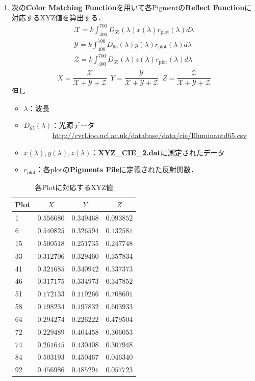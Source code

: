 \documentclass[a4paper,11pt]{jsarticle}
\numberwithin{theorem}{section}  %
\numberwithin{equation}{section} %
\begin{document}
\begin{enumerate}
\item

次の\textbf{Color Matching Function}を用いて各Pigmentの\textbf{Reflect Function}に対応するXYZ値を算出する．
\begin{eqnarray*}
\mathcal{X} = k\int_{400}^{700} D_{65}(\lambda)x(\lambda)r_{\text{plot}}(\lambda) d \lambda \\
\mathcal{Y} = k\int_{400}^{700} D_{65}(\lambda)y(\lambda)r_{\text{plot}}(\lambda) d \lambda \\
\mathcal{Z} = k\int_{400}^{700} D_{65}(\lambda)z(\lambda)r_{\text{plot}}(\lambda) d \lambda \\
\end{eqnarray*}
\begin{equation*}
X = \frac{\mathcal{X}}{\mathcal{X} + \mathcal{Y} + \mathcal{Z}}\,\,\,
Y = \frac{\mathcal{Y}}{\mathcal{X} + \mathcal{Y} + \mathcal{Z}}\,\,\,
Z = \frac{\mathcal{Z}}{\mathcal{X} + \mathcal{Y} + \mathcal{Z}}
\end{equation*}
但し
\begin{itemize}
\item $\lambda$：波長
\item $D_{65}(\lambda)$：光源データ\\
\,\,\,\,\,\,\,\,\,\,\,\,\,\,\,\,\,\,\,\,\,\,\,\,\url{http://cvrl.ioo.ucl.ac.uk/database/data/cie/Illuminantd65.csv}
\item $x(\lambda),y(\lambda),z(\lambda)$：\textbf{XYZ\_CIE\_2.dat}に測定されたデータ
\item $r_{\text{plot}}$：各plotの\textbf{Pigments File}に定義された反射関数．
\end{itemize}
\begin{table}[H]
\caption{各Plotに対応するXYZ値}
\begin{center}
\begin{tabular}{lccc}
\toprule
Plot & $X$ & $Y$ & $Z$  \\
\midrule
1 & $0.556680$ & $0.349468$ & $0.093852$\\
6 & $0.540825$ & $0.326594$ & $0.132581$\\
15 & $0.500518$ & $0.251735$ & $0.247748$\\
33 & $0.312706$ & $0.329460$ & $0.357834$\\
41 & $0.321685$ & $0.340942$ & $0.337373$\\
46 & $0.317175$ & $0.334973$ & $0.347852$\\
51 & $0.172133$ & $0.119266$ & $0.708601$\\
58 & $0.198234$ & $0.197832$ & $0.603933$\\
64 & $0.294274$ & $0.226222$ & $0.479504$\\
72 & $0.229489$ & $0.404458$ & $0.366053$\\
74 & $0.261645$ & $0.430408$ & $0.307948$\\
84 & $0.503193$ & $0.450467$ & $0.046340$\\
92 & $0.456986$ & $0.485291$ & $0.057723$\\
\bottomrule
\end{tabular}
\end{center}


\end{table}
\end{enumerate}
\end{document}
